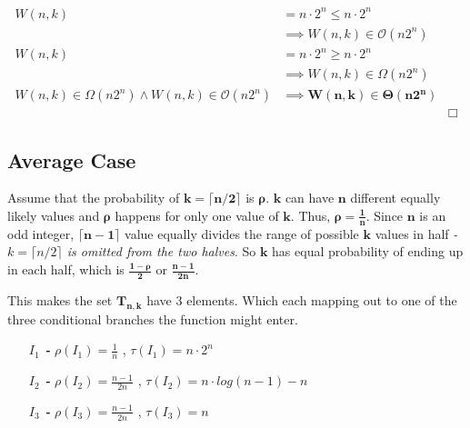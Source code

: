 \documentclass{article}
\begin{document}
\begin{align*}
W(n,k) &= n \cdot 2^{n} \le n \cdot 2^{n} &\\
 &\implies W(n,k) \in \mathcal{O}(n2^{n}) &\\
W(n,k) &= n \cdot 2^{n} \ge n \cdot 2^{n} &\\
 &\implies W(n,k) \in \Omega(n2^{n}) &\\
 W(n,k) \in \Omega(n2^{n}) \land W(n,k) \in \mathcal{O}(n2^{n}) &\implies \mathbf{W(n,k) \boldsymbol{\in} \Theta(n2^{n})} &\\
 & &\Box
\end{align*}

\goodbreak
\subsection*{Average Case}
Assume that the probability of $\mathbf{k = \lceil n/2\rceil}$ is $\boldsymbol{\rho}$. $\mathbf{k}$ can have $\mathbf{n}$ different equally likely values and $\boldsymbol{\rho}$ happens for only one value of $\mathbf{k}$. Thus, $\mathbf{\boldsymbol{\rho} = \frac{1}{n}}$. Since $\mathbf{n}$ is an odd integer, $\mathbf{\lceil n-1\rceil}$ value equally divides the range of possible $\mathbf{k}$ values in half \textit{- $\mathit{k = \lceil n/2\rceil}$ is omitted from the two halves}. So $\mathbf{k}$ has equal probability of ending up in each half, which is $\mathbf{\frac{1 - \boldsymbol{\rho}}{2}}$ or $\mathbf{\frac{n - 1}{2n}}$. \par
This makes the set $\mathbf{T_{n,k}}$ have 3 elements. Which each mapping out to one of the three conditional branches the function might enter. 

\begin{enumerate}[leftmargin=2.6cm]
    \item[\textit{\textbf{$I_{1}$ - }}] $\rho (\mathit{I_{1}}) = \frac{1}{n}$ ,  $\tau (\mathit{I_{1}}) = n \cdot 2^{n}$
    \item[\textit{\textbf{$I_{2}$ - }}] $\rho (\mathit{I_{2}}) = \frac{n-1}{2n}$ ,  $\tau (\mathit{I_{2}}) = n \cdot log(n-1) - n$
    \item[\textit{\textbf{$I_{3}$ - }}] $\rho (\mathit{I_{3}}) = \frac{n-1}{2n}$ ,  $\tau (\mathit{I_{3}}) = n$
\end{enumerate}
\end{document}
